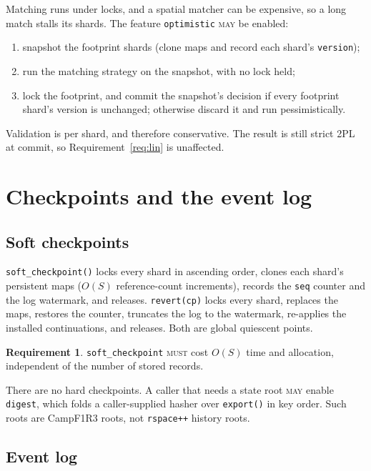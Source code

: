 \documentclass[11pt]{article}
\theoremstyle{plain}
\theoremstyle{definition}
\newtheorem{requirement}{Requirement}
\newcommand{\Camp}{CampF1R3}
\newcommand{\MUST}{\textsc{must}}
\newcommand{\MAY}{\textsc{may}}
\newcommand{\code}[1]{\texttt{#1}}
\begin{document}
Matching runs under locks, and a spatial matcher can be expensive, so a long match
stalls its shards. The feature \code{optimistic} \MAY{} be enabled:
\begin{enumerate}[nosep]
\item snapshot the footprint shards (clone maps and record each shard's
      \code{version});
\item run the matching strategy on the snapshot, with no lock held;
\item lock the footprint, and commit the snapshot's decision if every footprint
      shard's version is unchanged; otherwise discard it and run pessimistically.
\end{enumerate}
Validation is per shard, and therefore conservative. The result is still strict 2PL
at commit, so Requirement~\ref{req:lin} is unaffected.

\section{Checkpoints and the event log}\label{sec:checkpoint}

\subsection{Soft checkpoints}

\code{soft\_checkpoint()} locks every shard in ascending order, clones each shard's
persistent maps ($O(S)$ reference-count increments), records the \code{seq} counter
and the log watermark, and releases. \code{revert(cp)} locks every shard, replaces
the maps, restores the counter, truncates the log to the watermark, re-applies the
installed continuations, and releases. Both are global quiescent points.

\begin{requirement}
\code{soft\_checkpoint} \MUST{} cost $O(S)$ time and allocation, independent of the
number of stored records.
\end{requirement}

There are no hard checkpoints. A caller that needs a state root \MAY{} enable
\code{digest}, which folds a caller-supplied hasher over \code{export()} in key
order. Such roots are \Camp{} roots, not \code{rspace++} history roots.

\subsection{Event log}\label{sec:log}
\end{document}
